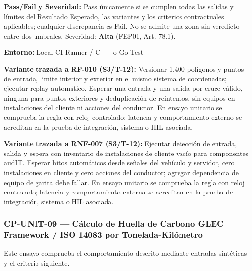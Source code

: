 \par\noindent\textbf{Pass/Fail y Severidad:} Pass únicamente si se cumplen todas las salidas y límites del Resultado Esperado, las variantes y los criterios contractuales aplicables; cualquier discrepancia es Fail. No se admite una zona sin veredicto entre dos umbrales. Severidad: \textbf{Alta} (FEP01, Art. 78.1).\par
\par\noindent\textbf{Entorno:} Local CI Runner / C++ o Go Test.\par







\par\noindent\textbf{Variante trazada a RF-010 (S3/T-12):} Versionar 1.400 polígonos y puntos de entrada, límite interior y exterior en el mismo sistema de coordenadas; ejecutar replay automático. Esperar una entrada y una salida por cruce válido, ninguna para puntos exteriores y deduplicación de reintentos, sin equipos en instalaciones del cliente ni acciones del conductor. En ensayo unitario se comprueba la regla con reloj controlado; latencia y comportamiento externo se acreditan en la prueba de integración, sistema o HIL asociada.\par

\par\noindent\textbf{Variante trazada a RNF-007 (S3/T-12):} Ejecutar detección de entrada, salida y espera con inventario de instalaciones de cliente vacío para componentes audIT. Esperar hitos automáticos desde señales del vehículo y servidor, cero instalaciones en cliente y cero acciones del conductor; agregar dependencia de equipo de garita debe fallar. En ensayo unitario se comprueba la regla con reloj controlado; latencia y comportamiento externo se acreditan en la prueba de integración, sistema o HIL asociada.\par
\subsubsection*{CP-UNIT-09 — Cálculo de Huella de Carbono GLEC Framework / ISO 14083 por Tonelada-Kilómetro}\label{sec:9-cp-unit-09}
Este ensayo comprueba el comportamiento descrito mediante entradas sintéticas y el criterio siguiente.

